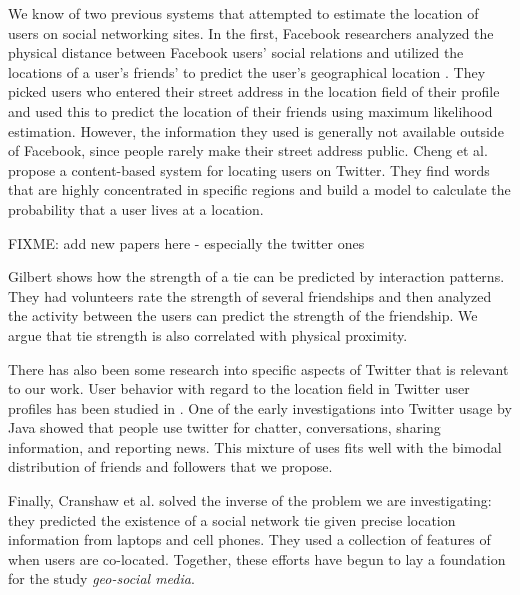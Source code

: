 We know of two previous systems that attempted to estimate the location of
users on social networking sites.  In the first, Facebook researchers analyzed
the physical distance between Facebook users' social relations and utilized the
locations of a user's friends' to predict the user's geographical location
\cite{backstrom2010find}.  They picked users who entered their street address
in the location field of their profile and used this to predict the location of
their friends using maximum likelihood estimation.  However, the information
they used is generally not available outside of Facebook, since people rarely
make their street address public.  Cheng et al. \cite{cheng2010you} propose a
content-based system for locating users on Twitter. They find words that are
highly concentrated in specific regions and build a model to calculate the
probability that a user lives at a location.

FIXME: add new papers here - especially the twitter ones

Gilbert \cite{gilbert2009predicting} shows how the strength of a tie can be
predicted by interaction patterns.  They had volunteers rate the strength of
several friendships and then analyzed the activity between the users can
predict the strength of the friendship.  We argue that tie strength is also
correlated with physical proximity.

There has also been some research into specific aspects of Twitter that is
relevant to our work.  User behavior with regard to the location field in
Twitter user profiles has been studied in \cite{hecht2011tweets}.  One of the
early investigations into Twitter usage by Java \cite{java2007we} showed that
people use twitter for chatter, conversations, sharing information, and
reporting news.  This mixture of uses fits well with the bimodal distribution
of friends and followers that we propose.

Finally, Cranshaw et al. \cite{cranshaw2010bridging} solved the inverse of the
problem we are investigating: they predicted the existence of a social network
tie given precise location information from laptops and cell phones. They used
a collection of features of when users are co-located.  Together, these efforts
have begun to lay a foundation for the study \textit{geo-social media}.

